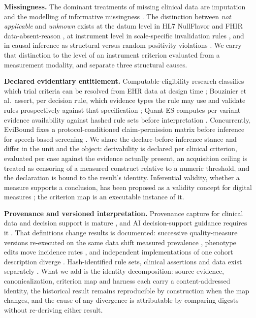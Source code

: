 \documentclass[11pt]{article}
\begin{document}
\textbf{Missingness.} The dominant treatments of missing clinical data are imputation and the modelling of informative missingness \citep{rubin1976,che2018grud,agniel2018,groenwold2020,mitra2023}. The distinction between \emph{not applicable} and \emph{unknown} exists at the datum level in HL7 NullFlavor and FHIR data-absent-reason \citep{hl7nullflavor,fhirdataabsent}, at instrument level in scale-specific invalidation rules \citep{goetz2015mdsupdrs}, and in causal inference as structural versus random positivity violations \citep{westreich2010positivity}. We carry that distinction to the level of an instrument criterion evaluated from a measurement modality, and separate three structural causes.

\textbf{Declared evidentiary entitlement.} Computable-eligibility research classifies which trial criteria can be resolved from EHR data at design time \citep{weng2010,ross2010,kopcke2013,raghavan2015,muqeeth2026}; Bouzinier et al.~assert, per decision rule, which evidence types the rule may use and validate rules prospectively against that specification \citep{bouzinier2026}; Quant ES computes per-variant evidence availability against hashed rule sets before interpretation \citep{saadat2025quantes}. Concurrently, EviBound fixes a protocol-conditioned claim-permission matrix before inference for speech-based screening \citep{gao2026evibound}. We share the declare-before-inference stance and differ in the unit and the object: derivability is declared per clinical criterion, evaluated per case against the evidence actually present, an acquisition ceiling is treated as censoring of a measured construct relative to a numeric threshold, and the declaration is bound to the result's identity. Inferential validity, whether a measure supports a conclusion, has been proposed as a validity concept for digital measures \citep{tekwe2026}; the criterion map is an executable instance of it.

\textbf{Provenance and versioned interpretation.} Provenance capture for clinical data and decision support is mature \citep{w3cprov,curcin2017jbi,gierend2024}, and AI decision-support guidance requires it \citep{labkoff2024,lekadir2025futureai}. That definitions change results is documented: successive quality-measure versions re-executed on the same data shift measured prevalence \citep{cholan2017amia,cholan2017egems}, phenotype edits move incidence rates \citep{makadia2023}, and independent implementations of one cohort description diverge \citep{ostropolets2023}. Hash-identified rule sets, clinical assertions and data exist separately \citep{saadat2025quantes,cao2026tracegraph,wack2025gitommix}. What we add is the identity decomposition: source evidence, canonicalization, criterion map and harness each carry a content-addressed identity, the historical result remains reproducible by construction when the map changes, and the cause of any divergence is attributable by comparing digests without re-deriving either result.
\end{document}
